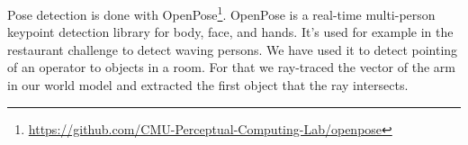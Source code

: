 Pose detection is done with OpenPose\footnote{\url{https://github.com/CMU-Perceptual-Computing-Lab/openpose}}.
OpenPose is a real-time multi-person keypoint detection library for body, face, and hands.
It's used for example in the restaurant challenge to detect waving persons.
We have used it to detect pointing of an operator to objects in a room.
For that we ray-traced the vector of the arm in our world model and extracted the first object that the ray intersects.

